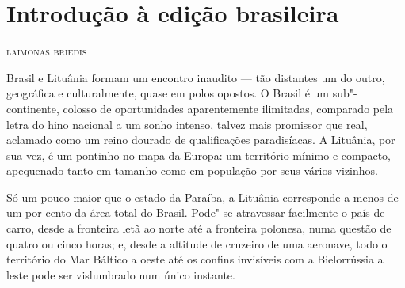 \chapter[Introdução à edição brasileira]{Introdução à edição brasileira }

\begin{flushright}
\textsc{laimonas briedis}
\end{flushright}

\setlength{\epigraphwidth}{.65\textwidth}
\begin{epigraphs} 

\medskip

\end{epigraphs}


\noindent{}Brasil e Lituânia formam um encontro inaudito --- tão distantes um do
outro, geográfica e culturalmente, quase em polos opostos. O Brasil é um
sub"-continente, colosso de oportunidades aparentemente ilimitadas,
comparado pela letra do hino nacional a um sonho intenso, talvez mais
promissor que real, aclamado como um reino dourado de qualificações
paradisíacas. A Lituânia, por sua vez, é um pontinho no mapa da Europa:
um território mínimo e compacto, apequenado tanto em tamanho como em
população por seus vários vizinhos. 

Só um pouco maior que o estado da
Paraíba, a Lituânia corresponde a menos de um por cento da área total do
Brasil. Pode"-se atravessar facilmente o país de carro, desde a fronteira
letã ao norte até a fronteira polonesa, numa questão de quatro ou cinco
horas; e, desde a altitude de cruzeiro de uma aeronave, todo o
território do Mar Báltico a oeste até os confins invisíveis com a
Bielorrússia a leste pode ser vislumbrado num único instante.

